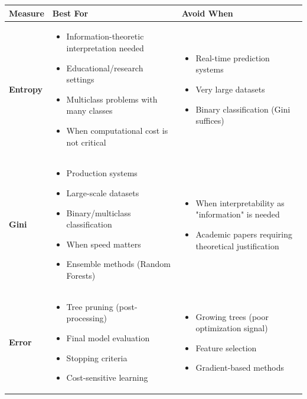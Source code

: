 \documentclass[12pt]{article}
\begin{document}
\begin{explanation}
\begin{center}
\begin{tabular}{|l|p{5cm}|p{5cm}|}
\hline
\textbf{Measure} & \textbf{Best For} & \textbf{Avoid When} \\
\hline
\textbf{Entropy} &
\begin{itemize}[leftmargin=*]
    \item Information-theoretic interpretation needed
    \item Educational/research settings
    \item Multiclass problems with many classes
    \item When computational cost is not critical
\end{itemize} &
\begin{itemize}[leftmargin=*]
    \item Real-time prediction systems
    \item Very large datasets
    \item Binary classification (Gini suffices)
\end{itemize} \\
\hline
\textbf{Gini} &
\begin{itemize}[leftmargin=*]
    \item Production systems
    \item Large-scale datasets
    \item Binary/multiclass classification
    \item When speed matters
    \item Ensemble methods (Random Forests)
\end{itemize} &
\begin{itemize}[leftmargin=*]
    \item When interpretability as "information" is needed
    \item Academic papers requiring theoretical justification
\end{itemize} \\
\hline
\textbf{Error} &
\begin{itemize}[leftmargin=*]
    \item Tree pruning (post-processing)
    \item Final model evaluation
    \item Stopping criteria
    \item Cost-sensitive learning
\end{itemize} &
\begin{itemize}[leftmargin=*]
    \item Growing trees (poor optimization signal)
    \item Feature selection
    \item Gradient-based methods
\end{itemize} \\
\hline
\end{tabular}
\end{center}


\end{explanation}
\end{document}
